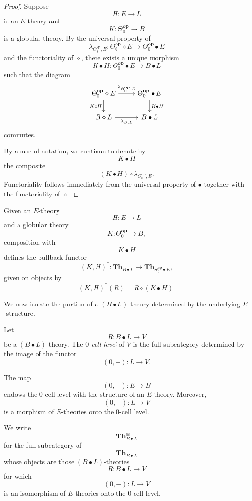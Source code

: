 \documentclass{tac}
\begin{document}
\begin{proof}
Suppose
\[
H:E\to L
\]
is an $E$-theory and
\[
K:\Theta_0^\mathbf{op}\to B
\]
is a globular theory. By the universal property of
\[
\lambda_{\Theta_0^\mathbf{op},E}:
\Theta_0^\mathbf{op}\diamond E
\longrightarrow
\Theta_0^\mathbf{op}\bullet E
\]
and the functoriality of $\diamond$, there exists a unique morphism
\[
K\bullet H:
\Theta_0^\mathbf{op}\bullet E
\longrightarrow
B\bullet L
\]
such that the diagram
\[
\begin{tikzcd}
\Theta_0^\mathbf{op}\diamond E
\ar[r,"\lambda_{\Theta_0^\mathbf{op},E}"]
\ar[d,swap,"K\diamond H"]
&
\Theta_0^\mathbf{op}\bullet E
\ar[d,"K\bullet H"]
\\
B\diamond L
\ar[r,swap,"\lambda_{B,L}"]
&
B\bullet L
\end{tikzcd}
\]
commutes.

By abuse of notation, we continue to denote by
\[
K\bullet H
\]
the composite
\[
(K\bullet H)\circ
\lambda_{\Theta_0^\mathbf{op},E}.
\]
Functoriality follows immediately from the universal property of $\bullet$ together with the functoriality of $\diamond$.
\end{proof}

\begin{definition}
Given an $E$-theory
\[
H:E\to L
\]
and a globular theory
\[
K:\Theta_0^\mathbf{op}\to B,
\]
composition with
\[
K\bullet H
\]
defines the pullback functor
\[
(K,H)^*:
\mathbf{Th}_{B\bullet L}
\longrightarrow
\mathbf{Th}_{\Theta_0^\mathbf{op}\bullet E},
\]
given on objects by
\[
(K,H)^*(R)=R\circ(K\bullet H).
\]
\end{definition}

We now isolate the portion of a $(B\bullet L)$-theory determined by the underlying $E$-structure.

\begin{definition}\label{the_zero_cell_level}
Let
\[
R:B\bullet L\to V
\]
be a $(B\bullet L)$-theory. The \emph{$0$-cell level} of $V$ is the full subcategory determined by the image of the functor
\[
(0,-):L\longrightarrow V.
\]
\end{definition}

\begin{lemma}
The map
\[
(0,-):E\longrightarrow B
\]
endows the $0$-cell level with the structure of an $E$-theory. Moreover,
\[
(0,-):L\longrightarrow V
\]
is a morphism of $E$-theories onto the $0$-cell level.
\end{lemma}

\begin{notation}\label{full_sub_iso_on_full_image}
We write
\[
\mathbf{Th}^{\cong}_{B\bullet L}
\]
for the full subcategory of
\[
\mathbf{Th}_{B\bullet L}
\]
whose objects are those $(B\bullet L)$-theories
\[
R:B\bullet L\to V
\]
for which
\[
(0,-):L\longrightarrow V
\]
is an isomorphism of $E$-theories onto the $0$-cell level.
\end{notation}
\end{document}
